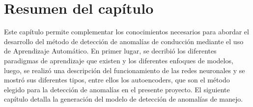 \section{Resumen del cap\'{i}tulo}

Este cap\'{i}tulo permite complementar los conocimientos necesarios para abordar el desarrollo del m\'{e}todo de detecci\'{o}n de anomal\'{i}as de conducci\'{o}n mediante el uso de Aprendizaje Autom\'{a}tico. En primer lugar, se decribi\'{o} los diferentes paradigmas de aprendizaje que existen y los diferentes enfoques de modelos, luego, se realiz\'{o} una descripci\'{o}n del funcionamiento de las redes neuronales y se mostr\'{o} sus diferentes tipos, entre ellos los autoencoders, que son  el m\'{e}todo elegido para la detecci\'{o}n de anomal\'{i}as en el presente proyecto. El siguiente cap\'{i}tulo detalla la generaci\'{o}n del modelo de detecci\'{o}n de anomal\'{i}as de manejo.